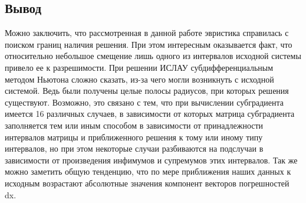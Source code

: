 \documentclass[../body.tex]{subfiles}
\begin{document}
\subsection{Вывод}
Можно заключить, что рассмотренная в данной работе эвристика справилась с поиском границ наличия решения. При этом интересным оказывается факт, что относительно небольшое смещение лишь одного из интервалов исходной системы привело ее к разрешимости. При решении ИСЛАУ субдифференциальным методом Ньютона сложно сказать, из-за чего могли возникнуть с исходной системой. Ведь были получены целые полосы радиусов, при которых решения существуют. Возможно, это связано с тем, что при вычислении субградиента имеется 16 различных случаев, в зависимости от которых матрица субградиента заполняется тем или иным способом в зависимости от принадлежности интервалов матрицы и приближенного решения к тому или иному типу интервалов, но при этом некоторые случаи разбиваются на подслучаи в зависимости от произведения инфимумов и супремумов этих интервалов. Так же можно заметить общую тенденцию, что по мере приближения наших данных к исходным возрастают абсолютные значения компонент векторов погрешностей dx.
\end{document}
